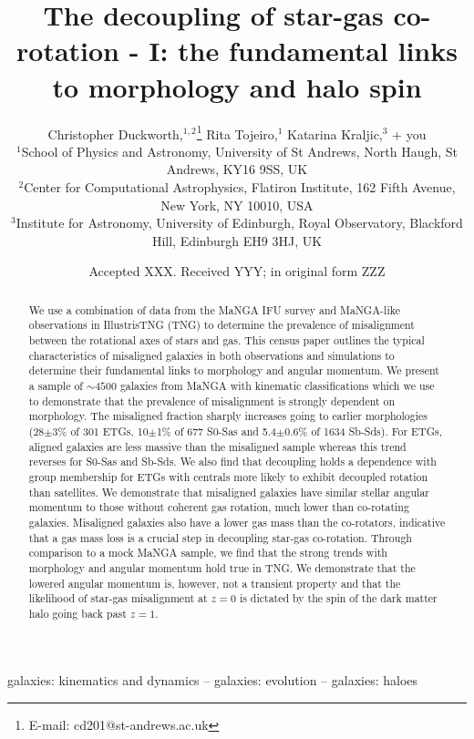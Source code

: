 \documentclass[fleqn,usenatbib]{mnras}
\title[The decoupling of star-gas co-rotation - I]{The decoupling of star-gas co-rotation - I: the fundamental links to morphology and halo spin}
\author[C. Duckworth et al.]{Christopher Duckworth,$^{1,2}$\thanks{E-mail: cd201@st-andrews.ac.uk}
Rita Tojeiro,$^{1}$
Katarina Kraljic,$^{3}$
+ you
\\
{}$^{1}$School of Physics and Astronomy, University of St Andrews, North Haugh, St Andrews, KY16 9SS, UK\\
$^{2}$Center for Computational Astrophysics, Flatiron Institute, 162 Fifth Avenue, New York, NY 10010, USA\\
{}$^{3}$Institute for Astronomy, University of Edinburgh, Royal Observatory, Blackford Hill, Edinburgh EH9 3HJ, UK\\
}
\date{Accepted XXX. Received YYY; in original form ZZZ}
\begin{document}
\label{firstpage}
\pagerange{\pageref{firstpage}--\pageref{lastpage}}
\maketitle

\begin{abstract}
We use a combination of data from the MaNGA IFU survey and MaNGA-like observations in IllustrisTNG (TNG) to determine the prevalence of misalignment between the rotational axes of stars and gas. This census paper outlines the typical characteristics of misaligned galaxies in both observations and simulations to determine their fundamental links to morphology and angular momentum. We present a sample of $\sim 4500$ galaxies from MaNGA with kinematic classifications which we use to demonstrate that the prevalence of misalignment is strongly dependent on morphology. The misaligned fraction sharply increases going to earlier morphologies (28$\pm$3\% of 301 ETGs, 10$\pm$1\% of 677 S0-Sas and 5.4$\pm$0.6\% of 1634 Sb-Sds). For ETGs, aligned galaxies are less massive than the misaligned sample whereas this trend reverses for S0-Sas and Sb-Sds. We also find that decoupling holds a dependence with group membership for ETGs with centrals more likely to exhibit decoupled rotation than satellites. 
We demonstrate that misaligned galaxies have similar stellar angular momentum to those without coherent gas rotation, much lower than co-rotating galaxies. Misaligned galaxies also have a lower gas mass than the co-rotators, indicative that a gas mass loss is a crucial step in decoupling star-gas co-rotation. 
Through comparison to a mock MaNGA sample, we find that the strong trends with morphology and angular momentum hold true in TNG. We demonstrate that the lowered angular momentum is, however, not a transient property and that the likelihood of star-gas misalignment at $z = 0$ is dictated by the spin of the dark matter halo going back past $z = 1$. 
\end{abstract}

\begin{keywords}
galaxies: kinematics and dynamics -- galaxies: evolution -- galaxies: haloes
\end{keywords}
\end{document}
